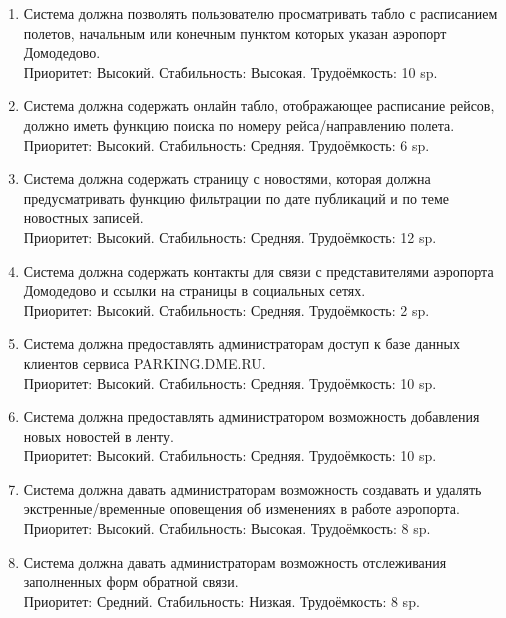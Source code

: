 
\begin{enumerate}
      \item Система должна позволять пользователю просматривать
            табло с расписанием полетов, начальным или конечным
            пунктом которых указан аэропорт Домодедово. \\
            Приоритет: Высокий. Стабильность: Высокая. Трудоёмкость: 10 sp.

      \item Система должна содержать онлайн табло, отображающее расписание рейсов,
            должно иметь функцию поиска по номеру рейса/направлению полета. \\
            Приоритет: Высокий. Стабильность: Средняя. Трудоёмкость: 6 sp.

      \item Система должна содержать страницу с новостями, которая должна
            предусматривать функцию фильтрации по дате публикаций и по
            теме новостных записей. \\
            Приоритет: Высокий. Стабильность: Средняя. Трудоёмкость: 12 sp.

      \item Система должна содержать контакты для связи с
            представителями аэропорта Домодедово и ссылки
            на страницы в социальных сетях. \\
            Приоритет: Высокий. Стабильность: Средняя. Трудоёмкость: 2 sp.

      \item Система должна предоставлять администраторам
            доступ к базе данных клиентов сервиса
            PARKING.DME.RU. \\
            Приоритет: Высокий. Стабильность: Средняя. Трудоёмкость: 10 sp.

      \item Система должна предоставлять администратором возможность
            добавления новых новостей в ленту. \\
            Приоритет: Высокий. Стабильность: Средняя. Трудоёмкость: 10 sp.

      \item Система должна давать администраторам возможность
            создавать и удалять экстренные/временные
            оповещения об изменениях в работе аэропорта. \\
            Приоритет: Высокий. Стабильность: Высокая. Трудоёмкость: 8 sp.

      \item Система должна давать администраторам возможность
            отслеживания заполненных форм обратной связи. \\
            Приоритет: Средний. Стабильность: Низкая. Трудоёмкость: 8 sp.


\end{enumerate}

